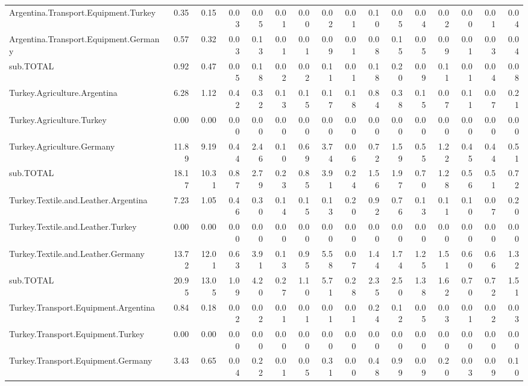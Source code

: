 \documentclass[a4paper]{article}\usepackage[]{graphicx}\usepackage[]{color}
\begin{document}
\begin{landscape}
\begin{table}[htbp]
\begin{tabular}{lrrrrrrrrrrrrrrr}
    Argentina.Transport.Equipment.Turkey & 0.35  & 0.15  & 0.03  & 0.05  & 0.01  & 0.00  & 0.02  & 0.01  & 0.10  & 0.05  & 0.04  & 0.02  & 0.00  & 0.01  & 0.04 \\
    Argentina.Transport.Equipment.Germany & 0.57  & 0.32  & 0.03  & 0.13  & 0.01  & 0.01  & 0.09  & 0.01  & 0.08  & 0.15  & 0.05  & 0.09  & 0.01  & 0.03  & 0.04 \\
    sub.TOTAL & 0.92  & 0.47  & 0.05  & 0.18  & 0.02  & 0.02  & 0.11  & 0.01  & 0.18  & 0.20  & 0.09  & 0.11  & 0.01  & 0.04  & 0.08 \\
    Turkey.Agriculture.Argentina & 6.28  & 1.12  & 0.42  & 0.32  & 0.13  & 0.15  & 0.17  & 0.18  & 0.84  & 0.38  & 0.15  & 0.07  & 0.11  & 0.07  & 0.21 \\
    Turkey.Agriculture.Turkey & 0.00  & 0.00  & 0.00  & 0.00  & 0.00  & 0.00  & 0.00  & 0.00  & 0.00  & 0.00  & 0.00  & 0.00  & 0.00  & 0.00  & 0.00 \\
    Turkey.Agriculture.Germany & 11.89 & 9.19  & 0.44  & 2.46  & 0.10  & 0.69  & 3.74  & 0.06  & 0.72  & 1.59  & 0.55  & 1.22  & 0.45  & 0.44  & 0.51 \\
    sub.TOTAL & 18.17 & 10.31 & 0.87  & 2.79  & 0.23  & 0.85  & 3.91  & 0.24  & 1.56  & 1.97  & 0.70  & 1.28  & 0.56  & 0.51  & 0.72 \\
    Turkey.Textile.and.Leather.Argentina & 7.23  & 1.05  & 0.46  & 0.30  & 0.14  & 0.15  & 0.13  & 0.20  & 0.92  & 0.76  & 0.13  & 0.11  & 0.10  & 0.07  & 0.20 \\
    Turkey.Textile.and.Leather.Turkey & 0.00  & 0.00  & 0.00  & 0.00  & 0.00  & 0.00  & 0.00  & 0.00  & 0.00  & 0.00  & 0.00  & 0.00  & 0.00  & 0.00  & 0.00 \\
    Turkey.Textile.and.Leather.Germany & 13.72 & 12.01 & 0.63  & 3.91  & 0.13  & 0.95  & 5.58  & 0.07  & 1.44  & 1.74  & 1.25  & 1.51  & 0.60  & 0.66  & 1.32 \\
    sub.TOTAL & 20.95 & 13.05 & 1.09  & 4.20  & 0.27  & 1.10  & 5.71  & 0.28  & 2.35  & 2.50  & 1.38  & 1.62  & 0.70  & 0.72  & 1.51 \\
    Turkey.Transport.Equipment.Argentina & 0.84  & 0.18  & 0.02  & 0.02  & 0.01  & 0.01  & 0.01  & 0.01  & 0.24  & 0.12  & 0.05  & 0.03  & 0.01  & 0.02  & 0.03 \\
    Turkey.Transport.Equipment.Turkey & 0.00  & 0.00  & 0.00  & 0.00  & 0.00  & 0.00  & 0.00  & 0.00  & 0.00  & 0.00  & 0.00  & 0.00  & 0.00  & 0.00  & 0.00 \\
    Turkey.Transport.Equipment.Germany & 3.43  & 0.65  & 0.04  & 0.22  & 0.01  & 0.05  & 0.31  & 0.00  & 0.48  & 0.99  & 0.09  & 0.20  & 0.03  & 0.09  & 0.10 \\

\end{tabular}
\end{table}
\end{landscape}
\end{document}
